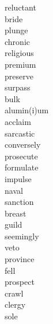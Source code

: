 \documentclass[a4paper, 11pt]{ctexart}
\begin{document}
\begin{multicols*}{3}
\begin{description}
\item[reluctant]

\item[bride]

\item[plunge]

\item[chronic]

\item[religious]

\item[premium]

\item[preserve]

\item[surpass]

\item[bulk]

\item[alumin(i)um]

\item[acclaim]

\item[sarcastic]

\item[conversely]

\item[prosecute]

\item[formulate]

\item[impulse]

\item[naval]

\item[sanction]

\item[breast]

\item[guild]

\item[seemingly]

\item[veto]

\item[province]

\item[fell]

\item[prospect]

\item[crawl]

\item[clergy]

\item[sole]


\end{description}
\end{multicols*}
\end{document}
